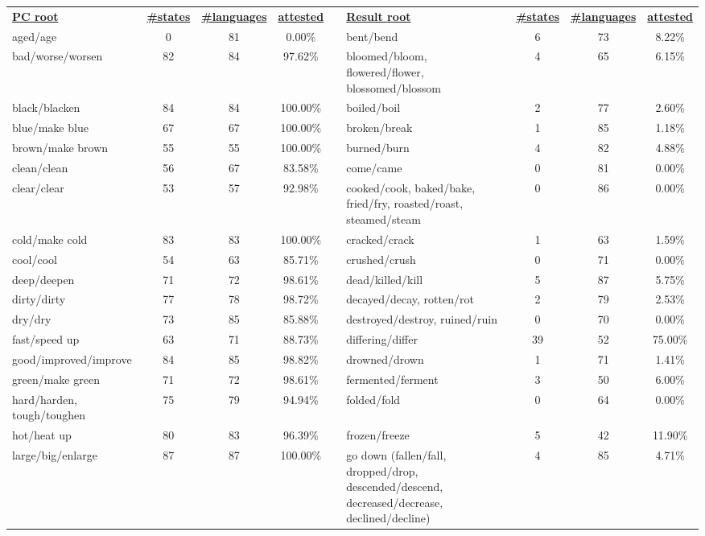 \begin{tabular}{p{3cm}ccccp{3cm}ccc}
\underline{\textbf{PC root}} & \underline{\textbf{\#states}} & \underline{\textbf{\#languages}} & \underline{\textbf{attested}} & & \underline{\textbf{Result root}} & \underline{\textbf{\#states}} & \underline{\textbf{\#languages}} & \underline{\textbf{attested}} \\
aged/age & 0 & 81 & 0.00\% & & bent/bend & 6 & 73 & 8.22\% \\
bad/worse/worsen & 82 & 84 & 97.62\% & & bloomed/bloom, flowered/flower, blossomed/blossom & 4 & 65 & 6.15\% \\
black/blacken & 84 & 84 & 100.00\% & & boiled/boil & 2 & 77 & 2.60\% \\
blue/make blue & 67 & 67 & 100.00\% & & broken/break & 1 & 85 & 1.18\% \\
brown/make brown & 55 & 55 & 100.00\% & & burned/burn & 4 & 82 & 4.88\% \\
clean/clean & 56 & 67 & 83.58\% & & come/came & 0 & 81 & 0.00\% \\
clear/clear & 53 & 57 & 92.98\% & & cooked/cook, baked/bake, fried/fry, roasted/roast, steamed/steam & 0 & 86 & 0.00\% \\
cold/make cold & 83 & 83 & 100.00\% & & cracked/crack & 1 & 63 & 1.59\% \\
cool/cool & 54 & 63 & 85.71\% & & crushed/crush & 0 & 71 & 0.00\% \\
deep/deepen & 71 & 72 & 98.61\% & & dead/killed/kill & 5 & 87 & 5.75\% \\
dirty/dirty & 77 & 78 & 98.72\% & & decayed/decay, rotten/rot & 2 & 79 & 2.53\% \\
dry/dry & 73 & 85 & 85.88\% & & destroyed/destroy, ruined/ruin & 0 & 70 & 0.00\% \\
fast/speed up & 63 & 71 & 88.73\% & & differing/differ & 39 & 52 & 75.00\% \\
good/improved/improve & 84 & 85 & 98.82\% & & drowned/drown & 1 & 71 & 1.41\% \\
green/make green & 71 & 72 & 98.61\% & & fermented/ferment & 3 & 50 & 6.00\% \\
hard/harden, tough/toughen & 75 & 79 & 94.94\% & & folded/fold & 0 & 64 & 0.00\% \\
hot/heat up & 80 & 83 & 96.39\% & & frozen/freeze & 5 & 42 & 11.90\% \\
large/big/enlarge & 87 & 87 & 100.00\% & & go down (fallen/fall, dropped/drop, descended/descend, decreased/decrease, declined/decline) & 4 & 85 & 4.71\% \\

\end{tabular}
